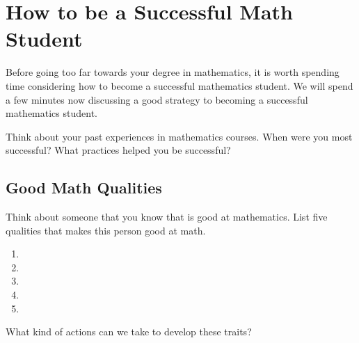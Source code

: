 
\section{How to be a Successful Math Student}


Before going too far towards your degree in mathematics, it is worth spending time considering how to become a successful mathematics student. We will spend a few minutes now discussing a good strategy to becoming a successful mathematics student.

\begin{exercise}
Think about your past experiences in mathematics courses. When were you most successful? What practices helped you be successful?
\end{exercise}

\blanks
\blanks

\subsection{Good Math Qualities}

\begin{exercise}
Think about someone that you know that is good at mathematics. List five qualities that makes this person good at math.
\end{exercise}

\begin{enumerate}
\item 
\item 
\item 
\item 
\item 
\end{enumerate}

\begin{exercise}
What kind of actions can we take to develop these traits?
\end{exercise}

\blanks
\blanks

